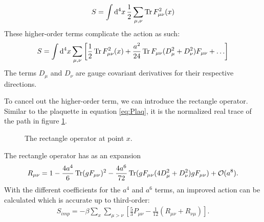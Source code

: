 \documentclass[11pt]{article}
\begin{document}
\begin{align}
	S=\int\dd[4]{x}\frac{1}{2}\sum_{\mu,\nu}\Trace F_{\mu\nu}^2(x)
	\label{eq:ContAction}
\end{align}
These higher-order terms complicate the action as such:
\begin{align}
	S=\int\dd[4]{x}\sum_{\mu,\nu}\left[\frac{1}{2}\Trace F_{\mu\nu}^2(x)+\frac{a^2}{24}\Trace F_{\mu\nu}(D_\mu^2+D_\nu^2)F_{\mu\nu}+\ldots\right]
\end{align}
The terms $D_\mu$ and $D_\nu$ are gauge covariant derivatives for their respective directions.

To cancel out the higher-order term, we can introduce the rectangle operator. Similar to the plaquette in equation \ref{eq:Plaq}, it is the normalized real trace of the path in figure \ref{fig:Rect}.
\begin{figure}[h]
\centering
{}
\caption{The rectangle operator at point $x$.} \label{fig:Rect}
\end{figure}
The rectangle operator has as an expansion
\begin{align}
	R_{\mu\nu}=1-\frac{4a^4}{6}\Trace(gF_{\mu\nu})^2-\frac{4a^6}{72}\Trace(gF_{\mu\nu}(4D_\mu^2+D_\nu^2)gF_{\mu\nu})+\mathcal{O}(a^8).
\end{align}
With the different coefficients for the $a^4$ and $a^6$ terms, an improved action can be calculated which is accurate up to third-order:
\begin{align}
	S_{imp}=-\beta\sum_x\sum_{\mu>\nu}\left[\frac{5}{3}P_{\mu\nu}-\frac{1}{12}(R_{\mu\nu}+R_{\nu\mu})\right].
	\label{eq:ImpAct}
\end{align}
\end{document}
